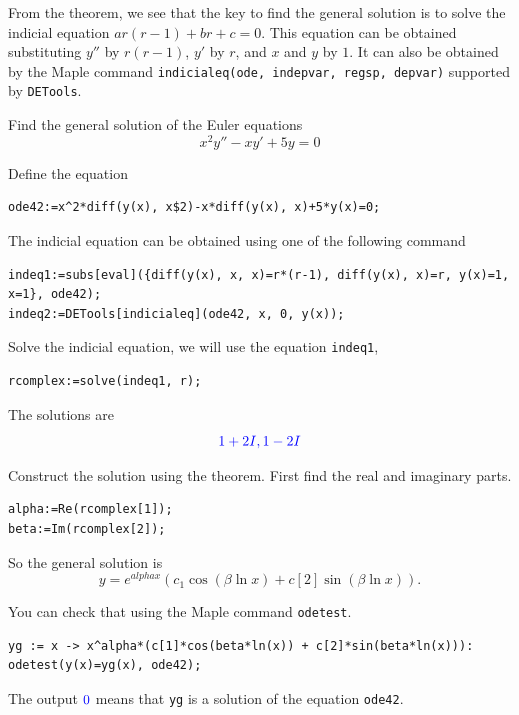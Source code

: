\documentclass[
  12pt]{elegantbook}
\begin{document}
From the theorem, we see that the key to find the general solution is to solve the indicial equation \(ar(r-1)+br+c=0\). This equation can be obtained substituting \(y''\) by \(r(r-1)\), \(y'\) by \(r\), and \(x\) and \(y\) by \(1\). It can also be obtained by the Maple command \texttt{indicialeq(ode,\ indepvar,\ regsp,\ depvar)} supported by \texttt{DETools}.

\begin{example}
Find the general solution of the Euler equations
\[x^2y''-xy'+5y=0\]
\end{example}

\begin{solution}
Define the equation

\begin{verbatim}
ode42:=x^2*diff(y(x), x$2)-x*diff(y(x), x)+5*y(x)=0;
\end{verbatim}

The indicial equation can be obtained using one of the following command

\begin{verbatim}
indeq1:=subs[eval]({diff(y(x), x, x)=r*(r-1), diff(y(x), x)=r, y(x)=1, x=1}, ode42);
indeq2:=DETools[indicialeq](ode42, x, 0, y(x));
\end{verbatim}

Solve the indicial equation, we will use the equation \texttt{indeq1},

\begin{verbatim}
rcomplex:=solve(indeq1, r);
\end{verbatim}

The solutions are
\[\color{blue}{1+2I, 1-2I}\]

Construct the solution using the theorem.
First find the real and imaginary parts.

\begin{verbatim}
alpha:=Re(rcomplex[1]);
beta:=Im(rcomplex[2]);
\end{verbatim}

So the general solution is
\[y=e^{alpha x}(c_1\cos(\beta\ln x)+c[2]\sin(\beta\ln x)).\]

You can check that using the Maple command \texttt{odetest}.

\begin{verbatim}
yg := x -> x^alpha*(c[1]*cos(beta*ln(x)) + c[2]*sin(beta*ln(x))):
odetest(y(x)=yg(x), ode42);
\end{verbatim}

The output \(\color{blue}{0}\) means that \texttt{yg} is a solution of the equation \texttt{ode42}.
\end{solution}
\end{document}
